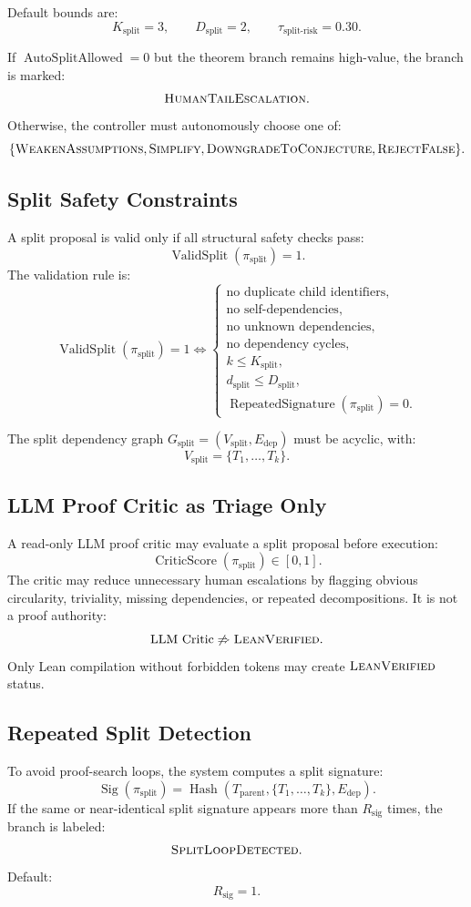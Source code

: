 \documentclass[11pt]{article}
\newcommand{\Hash}{\operatorname{Hash}}
\begin{document}
Default bounds are:
$$
K_{\text{split}}=3,
\qquad
D_{\text{split}}=2,
\qquad
\tau_{\text{split-risk}}=0.30.
$$

If $\operatorname{AutoSplitAllowed}=0$ but the theorem branch remains high-value, the branch is marked:
$$
\textsc{HumanTailEscalation}.
$$
Otherwise, the controller must autonomously choose one of:
$$
\{\textsc{WeakenAssumptions},\textsc{Simplify},\textsc{DowngradeToConjecture},\textsc{RejectFalse}\}.
$$

\subsection{Split Safety Constraints}
A split proposal is valid only if all structural safety checks pass:
$$
\operatorname{ValidSplit}(\pi_{\text{split}})=1.
$$
The validation rule is:
$$
\operatorname{ValidSplit}(\pi_{\text{split}})=1 \Longleftrightarrow
\begin{cases}
\text{no duplicate child identifiers},\\
\text{no self-dependencies},\\
\text{no unknown dependencies},\\
\text{no dependency cycles},\\
k\leq K_{\text{split}},\\
d_{\text{split}}\leq D_{\text{split}},\\
\operatorname{RepeatedSignature}(\pi_{\text{split}})=0.
\end{cases}
$$

The split dependency graph $G_{\text{split}}=(V_{\text{split}},E_{\text{dep}})$ must be acyclic, with:
$$
V_{\text{split}}=\{T_1,\dots,T_k\}.
$$

\subsection{LLM Proof Critic as Triage Only}
A read-only LLM proof critic may evaluate a split proposal before execution:
$$
\operatorname{CriticScore}(\pi_{\text{split}})\in[0,1].
$$
The critic may reduce unnecessary human escalations by flagging obvious circularity, triviality, missing dependencies, or repeated decompositions. It is not a proof authority:
$$
\text{LLM Critic}\not\Rightarrow\textsc{LeanVerified}.
$$
Only Lean compilation without forbidden tokens may create $\textsc{LeanVerified}$ status.

\subsection{Repeated Split Detection}
To avoid proof-search loops, the system computes a split signature:
$$
\operatorname{Sig}(\pi_{\text{split}})=\Hash(T_{\text{parent}},\{T_1,\dots,T_k\},E_{\text{dep}}).
$$
If the same or near-identical split signature appears more than $R_{\text{sig}}$ times, the branch is labeled:
$$
\textsc{SplitLoopDetected}.
$$
Default:
$$
R_{\text{sig}}=1.
$$
\end{document}
